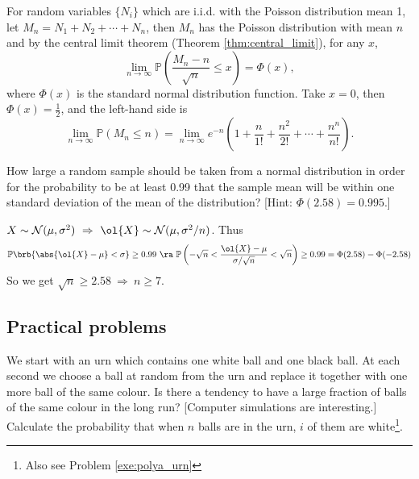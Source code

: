 \begin{solution}[\bf Solution.]
For random variables $\{N_i\}$ which are i.i.d. with the Poisson distribution mean 1, let $M_n=N_1+N_2+\cdots+N_n$, then $M_n$ has the Poisson distribution with mean $n$ and by the central limit theorem (Theorem \ref{thm:central_limit}), for any $x$,
\begin{equation}
\lim_{n\to\infty}\mathbb{P}\left(\frac{M_n- n}{\sqrt{n}}\leq x\right) = \Phi(x),
\end{equation}
where $\Phi(x)$ is the standard normal distribution function. Take $x=0$, then $\Phi(x)=\frac 12$, and the left-hand side is
\begin{equation}
\lim_{n\to\infty}\mathbb{P}\left( M_n \leq n \right) = \lim_{n\to\infty}e^{-n}\left(1+\frac{n}{1!}+\frac{n^2}{2!}+\cdots+ \frac{n^n}{n!}\right).
\end{equation}
\end{solution}


\begin{problem}
How large a random sample should be taken from a normal distribution in order for the probability to be at least 0.99 that the sample mean will be within one standard deviation of the mean of the distribution? [Hint: $\Phi(2.58)=0.995$.]
\end{problem}

\begin{solution}[\bf Solution.]
$X\sim\mathcal{N}(\mu,\sigma^2)\ \Rightarrow \ \ol{X}\sim \mathcal{N}(\mu,\sigma^2/n)$. Thus
\begin{equation}
\mathbb{P}\brb{\abs{\ol{X}-\mu}<\sigma} \geq 0.99 \ \ra \ \mathbb{P}\left(-\sqrt{n}<\frac{\ol{X}-\mu}{\sigma/\sqrt{n}}<\sqrt{n}\right) \geq 0.99 = \Phi(2.58) - \Phi(-2.58)
\end{equation}
So we get $\sqrt{n}\geq 2.58\ \Rightarrow \ n\geq 7$.
\end{solution}






\subsection{Practical problems}


\begin{problem}
We start with an urn which contains one white ball and one black ball. At each second we choose a ball at random from the urn and replace it together with one more ball of the same colour. Is there
a tendency to have a large fraction of balls of the same colour in the long run? [Computer simulations are interesting.] Calculate the probability that when $n$ balls are in the urn, $i$ of them are
white\footnote{Also see Problem \ref{exe:polya_urn}}.
\end{problem}

